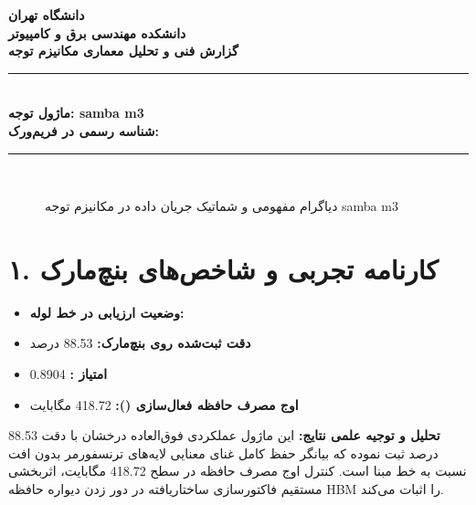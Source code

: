 \documentclass[12pt,a4paper]{article}
\begin{document}
\begin{center}
{\Large\bfseries دانشگاه تهران}\\[0.2cm]
{\large\bfseries دانشکده مهندسی برق و کامپیوتر}\\[0.2cm]
{\large\bfseries گزارش فنی و تحلیل معماری مکانیزم توجه}\\[0.5cm]
\rule{\linewidth}{1pt}\\[0.3cm]
{\LARGE\bfseries ماژول توجه: samba m3}\\[0.2cm]
{\large \textbf{شناسه رسمی در فریم‌ورک:} }\\[0.2cm]
\rule{\linewidth}{1pt}\\[0.5cm]
\end{center}

\begin{figure}[H]
\centering
{}
\caption{دیاگرام مفهومی و شماتیک جریان داده در مکانیزم توجه samba m3}
\end{figure}

\section*{۱. کارنامه تجربی و شاخص‌های بنچ‌مارک}
\begin{itemize}
\item \textbf{وضعیت ارزیابی در خط لوله:} 
\item \textbf{دقت ثبت‌شده روی بنچ‌مارک:} 88.53 درصد
\item \textbf{امتیاز :} 0.8904
\item \textbf{اوج مصرف حافظه فعال‌سازی ():} 418.72 مگابایت
\end{itemize}
\textbf{تحلیل و توجیه علمی نتایج:} این ماژول عملکردی فوق‌العاده درخشان با دقت 88.53 درصد ثبت نموده که بیانگر حفظ کامل غنای معنایی لایه‌های ترنسفورمر بدون افت نسبت به خط مبنا است. کنترل اوج مصرف حافظه در سطح 418.72 مگابایت، اثربخشی مستقیم فاکتورسازی ساختاریافته در دور زدن دیواره حافظه HBM را اثبات می‌کند.
\end{document}

